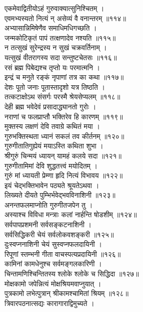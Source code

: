 एकमेवाद्वितीयोऽहं गुरुवाक्यात्सुनिश्चितम् ।\\
एवमभ्यस्यतो नित्यं न् असेव्यं वै वनान्तरम् ॥११४॥\\
अभ्यासान्निमिषेणैव समाधिमधिगच्छति ।\\
जन्मकोटिकृतं पापं तत्क्षणादेव नश्यति ॥११५॥\\
न तत्सुखं सुरेन्द्रस्य न सुखं चक्रवर्तिनाम् ।\\
यत्सुखं वीतरागस्य सदा सन्तुष्टचेतसः ॥११६॥\\
रसं ब्रह्म पिबेद्यश्च तृप्तो यः परमात्मनि ।\\
इन्द्रं च मनुते रङ्कं नृपाणां तत्र का कथा ॥११७॥\\
देशः पूतो जनाः पूतास्तादृशो यत्र तिष्ठति ।\\
तत्कटाक्षोऽथ संसर्गः परस्मै श्रेयसेप्यलम् ॥११८॥\\
देही ब्रह्म भवेदेवं प्रसादाद्ध्यानतो गुरोः ।\\
नराणां च फलप्राप्तौ भक्तिरेव हि कारणम् ॥११९॥\\
मुक्तस्य लक्षणं देवि तवाग्रे कथितं मया ।\\
गुरुभक्तिस्थता ध्यानं सकलं तव कीर्तनम् ॥१२०॥\\
गुरुगीतातिगुह्येयं मयाऽस्ति कथिता शुभा ।\\
श्रीगुरुं चिन्मयं ध्यायन् यामहं कलये सदा ॥१२१॥\\
गुरुगीतामिमां देवि शुद्धतत्त्वं मयोदितम् ।\\
गुरुं मां ध्यायती प्रेम्णा हृदि नित्यं विभावय ॥१२२॥\\
इयं चेद्भक्तिभावेन पठ्यते श्रूयतेऽथवा ।\\
लिख्यते दीयते पुम्भिर्भवेद्भवविनाशिनी ॥१२३॥\\
अनन्तफलमाप्नोति गुरुगीतजपेन तु ।\\
अस्याश्च विविधा मन्त्राः कलां नार्हन्ति षोडशीम् ॥१२४॥\\
सर्वपापप्रशमनी सर्वसङ्कटनाशिनी ।\\
सर्वसिद्धिकरी चेयं सर्वलोकवशङ्करी ॥१२५॥\\
दुःस्वप्ननाशिनी चेयं सुस्वप्नफलदायिनी ।\\
रिपूणां स्तम्भनी गीता वाचस्पत्यप्रदायिनी ॥१२६॥\\
कामिनां कामधेनुश्च सर्वमङ्गलकारिणी ।\\
चिन्तामणिश्चिन्तितस्य श्लोके श्लोके च सिद्धिदा ॥१२७॥\\
मोक्षकामो जपेन्नित्यं मोक्षश्रियमवाप्नुयात् ।\\
पुत्रकामो लभेत्पुत्रान् श्रीकामश्चामितां श्रियम् ॥१२८॥\\
त्रिवारपठनात्सद्यः कारागाराद्विमुच्यते ।\\
